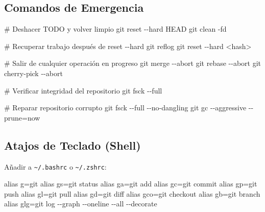 \documentclass[
  doc,
  floatsintext,
  longtable,
  a4paper,
  nolmodern,
  notxfonts,
  notimes,
  12pt,
  colorlinks=true,linkcolor=blue,citecolor=blue,urlcolor=blue]{apa7}
\newenvironment{Shaded}{\begin{snugshade}}{\end{snugshade}}
\newcommand{\AlertTok}[1]{\textcolor[rgb]{0.68,0.00,0.00}{#1}}
\newcommand{\AttributeTok}[1]{\textcolor[rgb]{0.40,0.45,0.13}{#1}}
\newcommand{\BuiltInTok}[1]{\textcolor[rgb]{0.00,0.23,0.31}{#1}}
\newcommand{\CommentTok}[1]{\textcolor[rgb]{0.37,0.37,0.37}{#1}}
\newcommand{\FunctionTok}[1]{\textcolor[rgb]{0.28,0.35,0.67}{#1}}
\newcommand{\NormalTok}[1]{\textcolor[rgb]{0.00,0.23,0.31}{#1}}
\newcommand{\OperatorTok}[1]{\textcolor[rgb]{0.37,0.37,0.37}{#1}}
\newcommand{\StringTok}[1]{\textcolor[rgb]{0.13,0.47,0.30}{#1}}
\begin{document}
\subsection{Comandos de Emergencia}\label{comandos-de-emergencia}

\begin{Shaded}
\begin{Highlighting}[]
\CommentTok{\# Deshacer }\AlertTok{TODO}\CommentTok{ y volver limpio}
\FunctionTok{git}\NormalTok{ reset }\AttributeTok{{-}{-}hard}\NormalTok{ HEAD}
\FunctionTok{git}\NormalTok{ clean }\AttributeTok{{-}fd}

\CommentTok{\# Recuperar trabajo después de reset {-}{-}hard}
\FunctionTok{git}\NormalTok{ reflog}
\FunctionTok{git}\NormalTok{ reset }\AttributeTok{{-}{-}hard} \OperatorTok{\textless{}}\NormalTok{hash}\OperatorTok{\textgreater{}}

\CommentTok{\# Salir de cualquier operación en progreso}
\FunctionTok{git}\NormalTok{ merge }\AttributeTok{{-}{-}abort}
\FunctionTok{git}\NormalTok{ rebase }\AttributeTok{{-}{-}abort}
\FunctionTok{git}\NormalTok{ cherry{-}pick }\AttributeTok{{-}{-}abort}

\CommentTok{\# Verificar integridad del repositorio}
\FunctionTok{git}\NormalTok{ fsck }\AttributeTok{{-}{-}full}

\CommentTok{\# Reparar repositorio corrupto}
\FunctionTok{git}\NormalTok{ fsck }\AttributeTok{{-}{-}full} \AttributeTok{{-}{-}no{-}dangling}
\FunctionTok{git}\NormalTok{ gc }\AttributeTok{{-}{-}aggressive} \AttributeTok{{-}{-}prune}\OperatorTok{=}\NormalTok{now}
\end{Highlighting}
\end{Shaded}

\subsection{Atajos de Teclado (Shell)}\label{atajos-de-teclado-shell}

Añadir a \texttt{\textasciitilde{}/.bashrc} o
\texttt{\textasciitilde{}/.zshrc}:

\begin{Shaded}
\begin{Highlighting}[]
\BuiltInTok{alias}\NormalTok{ g=}\StringTok{\textquotesingle{}git\textquotesingle{}}
\BuiltInTok{alias}\NormalTok{ gs=}\StringTok{\textquotesingle{}git status\textquotesingle{}}
\BuiltInTok{alias}\NormalTok{ ga=}\StringTok{\textquotesingle{}git add\textquotesingle{}}
\BuiltInTok{alias}\NormalTok{ gc=}\StringTok{\textquotesingle{}git commit\textquotesingle{}}
\BuiltInTok{alias}\NormalTok{ gp=}\StringTok{\textquotesingle{}git push\textquotesingle{}}
\BuiltInTok{alias}\NormalTok{ gl=}\StringTok{\textquotesingle{}git pull\textquotesingle{}}
\BuiltInTok{alias}\NormalTok{ gd=}\StringTok{\textquotesingle{}git diff\textquotesingle{}}
\BuiltInTok{alias}\NormalTok{ gco=}\StringTok{\textquotesingle{}git checkout\textquotesingle{}}
\BuiltInTok{alias}\NormalTok{ gb=}\StringTok{\textquotesingle{}git branch\textquotesingle{}}
\BuiltInTok{alias}\NormalTok{ glg=}\StringTok{\textquotesingle{}git log {-}{-}graph {-}{-}oneline {-}{-}all {-}{-}decorate\textquotesingle{}}
\end{Highlighting}
\end{Shaded}
\end{document}
